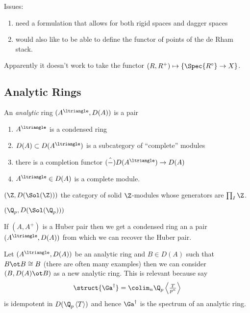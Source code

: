 \documentclass[12pt]{article}
\begin{document}
Issues:
\begin{enumerate}
\item need a formulation that allows for both rigid spaces and dagger spaces
\item would also like to be able to define the functor of points of the de Rham stack.
\end{enumerate}

Apparently it doesn't work to take the functor $(R, R^+) \mapsto \{ \Spec{R^\circ} \to X \}$. 

\subsection{Analytic Rings}

\begin{defn}
An \textit{analytic} ring $(A^{\ltriangle}, D(A))$ is a pair
\begin{enumerate}
\item $A^{\ltriangle}$ is a condensed ring
\item $D(A) \subset D(A^{\ltriangle})$ is a subcategory of ``complete'' modules
\item there is a completion functor $\hat{(-)} D(A^\ltriangle) \to D(A)$
\item $A^{\ltriangle} \in D(A)$ is a complete module.  
\end{enumerate} 
\end{defn}

\begin{example}
$(\Z, D(\Sol(\Z)))$ the category of solid $\Z$-modules whose generators are $\prod_I \Z$. 
\end{example}

\begin{example}
$(\Q_p, D(\Sol(\Q_p)))$ 
\end{example}

\begin{example}
If $(A, A^+)$ is a Huber pair then we get a condensed ring an a pair $(A^{\ltriangle}, D(A))$ from which we can recover the Huber pair. 
\end{example}

\begin{rmk}
Let $(A^{\ltriangle}, D(A))$ be an analytic ring and $B \in D(A)$ such that $B \ot B \cong B$ (there are often many examples) then we can consider $(B, D(A) \ot B)$ as a new analytic ring. This is relevant because say
\[ \struct{\Ga^\dagger} = \colim_n \Q_p \left< \tfrac{T}{p^n} \right> \]
is idempotent in $D(\Q_p\left< T \right>)$ and hence $\Ga^\dagger$ is the spectrum of an analytic ring. 
\end{rmk}
\end{document}
